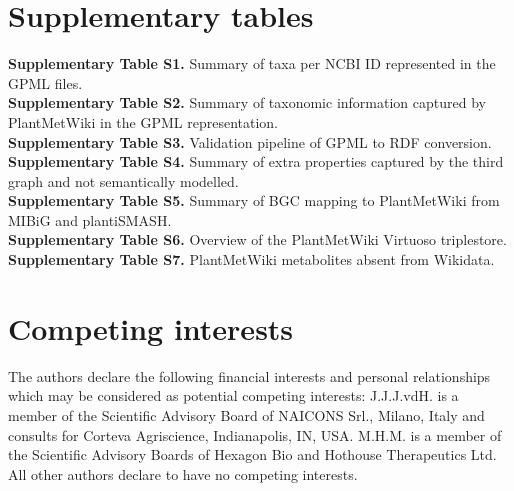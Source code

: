 \documentclass[11pt,a4paper]{article}
\begin{document}
\section*{Supplementary tables}

\textbf{Supplementary Table S1.} Summary of taxa per NCBI ID represented in the GPML files.\\
\textbf{Supplementary Table S2.} Summary of taxonomic information captured by PlantMetWiki in the GPML representation.\\
\textbf{Supplementary Table S3.} Validation pipeline of GPML to RDF conversion.\\
\textbf{Supplementary Table S4.} Summary of extra properties captured by the third graph and not semantically modelled.\\
\textbf{Supplementary Table S5.} Summary of BGC mapping to PlantMetWiki from MIBiG and plantiSMASH.\\
\textbf{Supplementary Table S6.} Overview of the PlantMetWiki Virtuoso triplestore.\\
\textbf{Supplementary Table S7.} PlantMetWiki metabolites absent from Wikidata.




\section*{Competing interests}

The authors declare the following financial interests and personal relationships which may be
considered as potential competing interests: J.J.J.vdH. is a member of the Scientific Advisory Board
of NAICONS Srl., Milano, Italy and consults for Corteva Agriscience, Indianapolis, IN, USA. M.H.M. is
a member of the Scientific Advisory Boards of Hexagon Bio and Hothouse Therapeutics Ltd. All other
authors declare to have no competing interests.
\end{document}
